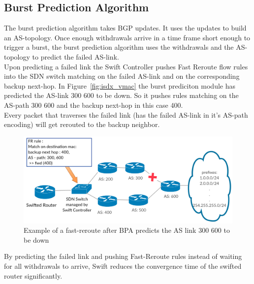 \subsection{\label{chapter2:Swift:BPA}Burst Prediction Algorithm}
The burst prediction algorithm takes BGP updates. It uses the updates to build an AS-topology. Once enough withdrawals arrive in a time frame short enough to trigger a burst, the burst prediction algorithm uses the withdrawals and the AS-topology to predict the failed AS-link. \\
Upon predicting a failed link the Swift Controller pushes Fast Reroute flow rules into the SDN switch matching on the failed AS-link and on the corresponding backup next-hop. In Figure~\ref{fig:isdx_vmac} the burst prediciton module has predicted the AS-link 300 600 to be down. So it pushes rules matching on the AS-path 300 600 and the backup next-hop in this case 400.\\
Every packet that traverses the failed link (has the failed AS-link in it's AS-path encoding) will get rerouted to the backup neighbor.
\begin{figure}[h]
\center
\includegraphics[scale = 0.36]{Figures/bckgrnd_swift_fr.pdf}
\caption{Example of a fast-reroute after BPA predicts the AS link 300 600 to be down}
\label{fig:swift_FR}
\end{figure}

By predicting the failed link and pushing Fast-Reroute rules instead of waiting for all withdrawals to arrive, Swift reduces the convergence time of the swifted router significantly.





